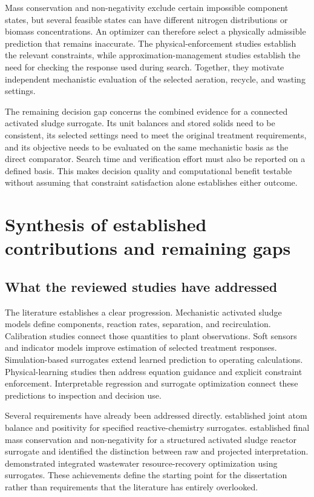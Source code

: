 Mass conservation and non-negativity exclude certain impossible component states, but several feasible states can have different nitrogen distributions or biomass concentrations. An optimizer can therefore select a physically admissible prediction that remains inaccurate. The physical-enforcement studies establish the relevant constraints, while approximation-management studies establish the need for checking the response used during search. Together, they motivate independent mechanistic evaluation of the selected aeration, recycle, and wasting settings.

The remaining decision gap concerns the combined evidence for a connected activated sludge surrogate. Its unit balances and stored solids need to be consistent, its selected settings need to meet the original treatment requirements, and its objective needs to be evaluated on the same mechanistic basis as the direct comparator. Search time and verification effort must also be reported on a defined basis. This makes decision quality and computational benefit testable without assuming that constraint satisfaction alone establishes either outcome.

\section{Synthesis of established contributions and remaining gaps}

\subsection{What the reviewed studies have addressed}

The literature establishes a clear progression. Mechanistic activated sludge models define components, reaction rates, separation, and recirculation. Calibration studies connect those quantities to plant observations. Soft sensors and indicator models improve estimation of selected treatment responses. Simulation-based surrogates extend learned prediction to operating calculations. Physical-learning studies then address equation guidance and explicit constraint enforcement. Interpretable regression and surrogate optimization connect these predictions to inspection and decision use.

Several requirements have already been addressed directly. \citet{KircherVotsmeier2025} established joint atom balance and positivity for specified reactive-chemistry surrogates. \citet{Selerio2026} established final mass conservation and non-negativity for a structured activated sludge reactor surrogate and identified the distinction between raw and projected interpretation. \citet{Durkin2024} demonstrated integrated wastewater resource-recovery optimization using surrogates. These achievements define the starting point for the dissertation rather than requirements that the literature has entirely overlooked.

